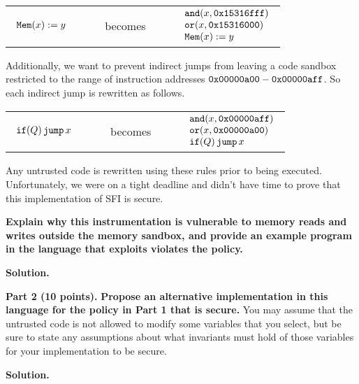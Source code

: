 \documentclass[10pt]{article}
\newcommand{\pand}[2]{\keywordfont{and}(#1, #2)}
\newcommand{\por}[2]{\keywordfont{or}(#1, #2)}
\begin{document}
\begin{enumerate}
\begin{center}
\begin{tabular}{lcl}
$
\begin{array}{l}
\texttt{\upshape Mem}(x) := y
\end{array}
$
&
\ \ \ \ becomes\ \ \ \ 
&
$
\begin{array}{l}
\pand{x}{\keywordfont{0x15316fff}} \\
\por{x}{\keywordfont{0x15316000}} \\
\pderef{x} := y
\end{array}
$
\end{tabular}
\end{center}
Additionally, we want to prevent indirect jumps from leaving a code sandbox restricted to the range of instruction addresses $\texttt{\upshape 0x00000a00} - \texttt{\upshape 0x00000aff}$. So each indirect jump is rewritten as follows.
\begin{center}
\begin{tabular}{lcl}
$
\begin{array}{l}
\texttt{\upshape if}(Q)\,\texttt{\upshape jump}\,x
\end{array}
$
&
\ \ \ \ becomes\ \ \ \ 
&
$
\begin{array}{l}
\pand{x}{\keywordfont{0x00000aff}} \\
\por{x}{\keywordfont{0x00000a00}} \\
\pifjump{\ivr}{x}
\end{array}
$
\end{tabular}
\end{center}
Any untrusted code is rewritten using these rules prior to being executed.
Unfortunately, we were on a tight deadline and didn't have time to prove that this implementation of SFI is secure. 

\newpage

\textbf{Explain why this instrumentation is vulnerable to memory reads and writes outside the memory sandbox, and provide an example program in the language that exploits  violates the policy.}

\textbf{Solution.}



\newpage

\textbf{Part 2 (10 points).} \textbf{Propose an alternative implementation in this language for the policy in Part 1 that is secure.} You may assume that the untrusted code is not allowed to modify some variables that you select, but be sure to state any assumptions about what invariants must hold of those variables for your implementation to be secure.

\textbf{Solution.}


\end{enumerate}
\end{document}
